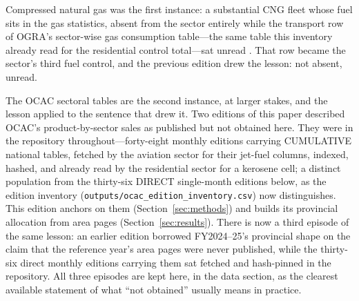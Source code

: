 Compressed natural gas was the first instance: a substantial CNG fleet whose fuel sits in
the gas statistics, absent from the sector entirely while the transport row of OGRA's
sector-wise gas consumption table---the same table this inventory already read for the
residential control total---sat unread \citep{ogra2024,ograarchive}. That row became the
sector's third fuel control, and the previous edition drew the lesson: not absent, unread.

The OCAC sectoral tables are the second instance, at larger stakes, and the lesson applied
to the sentence that drew it. Two editions of this paper described OCAC's product-by-sector
sales as published but not obtained here. They were in the repository throughout---forty-eight monthly editions carrying
CUMULATIVE national tables, fetched by the aviation sector for their jet-fuel columns,
indexed, hashed, and already read by the residential sector for a kerosene cell; a
distinct population from the thirty-six DIRECT single-month editions below, as the edition
inventory (\texttt{outputs/ocac\_edition\_inventory.csv}) now distinguishes. This edition anchors on them (Section~\ref{sec:methods}) and builds its provincial
allocation from area pages (Section~\ref{sec:results}). There is now a third episode of
the same lesson: an earlier edition borrowed FY2024--25's provincial shape on the claim
that the reference year's area pages were never published, while the thirty-six direct
monthly editions carrying them sat fetched and hash-pinned in the repository. All three
episodes are kept here, in the data section, as the clearest available statement of what
``not obtained'' usually means in practice.
